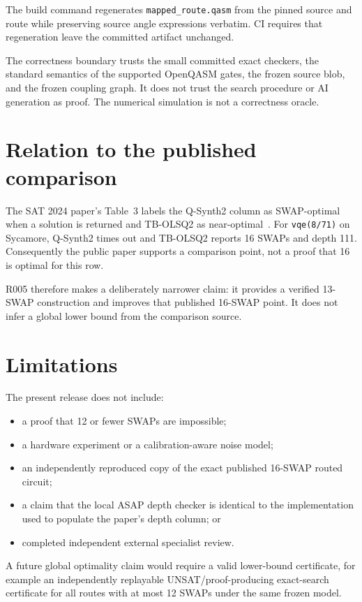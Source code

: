 \documentclass[11pt]{article}
\begin{document}
The build command regenerates \texttt{mapped\_route.qasm} from the pinned
source and route while preserving source angle expressions verbatim.  CI
requires that regeneration leave the committed artifact unchanged.

The correctness boundary trusts the small committed exact checkers, the
standard semantics of the supported OpenQASM gates, the frozen source blob,
and the frozen coupling graph.  It does not trust the search procedure or AI
generation as proof.  The numerical simulation is not a correctness oracle.

\section{Relation to the published comparison}

The SAT 2024 paper's Table~3 labels the Q-Synth2 column as SWAP-optimal when a
solution is returned and TB-OLSQ2 as near-optimal~\cite{shaik2024}.  For
\texttt{vqe(8/71)} on Sycamore, Q-Synth2 times out and TB-OLSQ2 reports
16 SWAPs and depth 111.  Consequently the public paper supports a comparison
point, not a proof that 16 is optimal for this row.

R005 therefore makes a deliberately narrower claim: it provides a verified
13-SWAP construction and improves that published 16-SWAP point.  It does not
infer a global lower bound from the comparison source.

\section{Limitations}

The present release does not include:

\begin{itemize}
  \item a proof that 12 or fewer SWAPs are impossible;
  \item a hardware experiment or a calibration-aware noise model;
  \item an independently reproduced copy of the exact published 16-SWAP
        routed circuit;
  \item a claim that the local ASAP depth checker is identical to the
        implementation used to populate the paper's depth column; or
  \item completed independent external specialist review.
\end{itemize}

A future global optimality claim would require a valid lower-bound certificate,
for example an independently replayable UNSAT/proof-producing exact-search
certificate for all routes with at most 12 SWAPs under the same frozen model.
\end{document}
